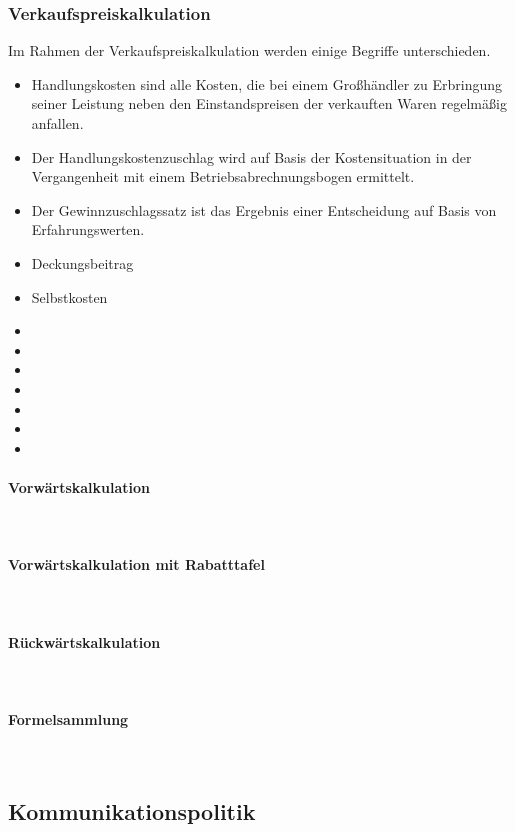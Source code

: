 {			 
\subsubsection{Verkaufspreiskalkulation}

Im Rahmen der Verkaufspreiskalkulation werden einige Begriffe unterschieden.

\begin{itemize}
	\item Handlungskosten sind alle Kosten, die bei einem Großhändler zu Erbringung seiner Leistung neben den Einstandspreisen der verkauften Waren regelmäßig anfallen.
	\item Der Handlungskostenzuschlag wird auf Basis der Kostensituation in der Vergangenheit mit einem Betriebsabrechnungsbogen ermittelt.
	\item Der Gewinnzuschlagssatz ist das Ergebnis einer Entscheidung auf Basis von Erfahrungswerten.
	\item Deckungsbeitrag
	\item Selbstkosten
	\item 
	\item 
	\item 
	\item 
	\item 
	\item 
	\item 
\end{itemize}

\paragraph{Vorwärtskalkulation}~\\
\paragraph{Vorwärtskalkulation mit Rabatttafel}~\\
\paragraph{Rückwärtskalkulation}~\\
\paragraph{Formelsammlung}~\\		 

\subsection{Kommunikationspolitik}

}
